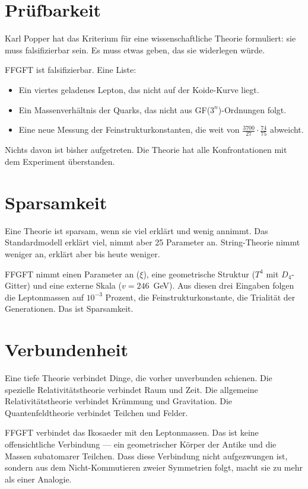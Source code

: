 \documentclass[12pt,oneside]{book}
\begin{document}
\section{Prüfbarkeit}

Karl Popper hat das Kriterium für eine wissenschaftliche Theorie formuliert: sie muss falsifizierbar sein. Es muss etwas geben, das sie widerlegen würde.

FFGFT ist falsifizierbar. Eine Liste:

\begin{itemize}
\item Ein viertes geladenes Lepton, das nicht auf der Koide-Kurve liegt.
\item Ein Massenverhältnis der Quarks, das nicht aus GF($3^n$)-Ordnungen folgt.
\item Eine neue Messung der Fein\-struktur\-konstanten, die weit von $\frac{3700}{27} \cdot \frac{74}{75}$ abweicht.
\end{itemize}

Nichts davon ist bisher aufgetreten. Die Theorie hat alle Konfrontationen mit dem Experiment überstanden.

\section{Sparsamkeit}

Eine Theorie ist sparsam, wenn sie viel erklärt und wenig annimmt. Das Standardmodell erklärt viel, nimmt aber 25 Parameter an. String-Theorie nimmt weniger an, erklärt aber bis heute weniger.

FFGFT nimmt einen Parameter an ($\xi$), eine geometrische Struktur ($T^4$ mit $D_4$-Gitter) und eine externe Skala ($v = 246$~GeV). Aus diesen drei Eingaben folgen die Leptonmassen auf $10^{-3}$ Prozent, die Fein\-struktur\-konstante, die Trialität der Generationen. Das ist Sparsamkeit.

\section{Verbundenheit}

Eine tiefe Theorie verbindet Dinge, die vorher unverbunden schienen. Die spezielle Relativitätstheorie verbindet Raum und Zeit. Die allgemeine Relativitätstheorie verbindet Krümmung und Gravitation. Die Quantenfeldtheorie verbindet Teilchen und Felder.

FFGFT verbindet das Ikosaeder mit den Leptonmassen. Das ist keine offensichtliche Verbindung — ein geometrischer Körper der Antike und die Massen subatomarer Teilchen. Dass diese Verbindung nicht aufgezwungen ist, sondern aus dem Nicht-Kommutieren zweier Symmetrien folgt, macht sie zu mehr als einer Analogie.
\end{document}
